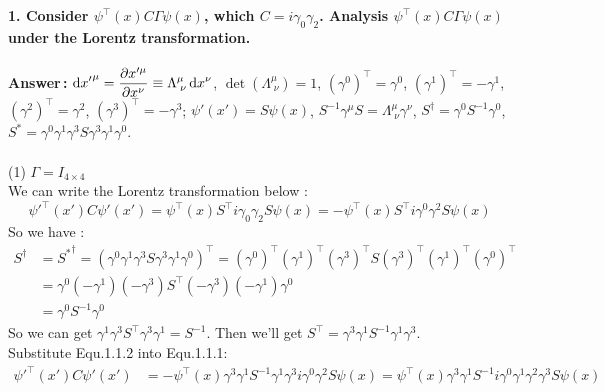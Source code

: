 \documentclass[12pt]{article}
\begin{document}
\begin{spacing}{1.5}
\textbf{1. Consider $\psi^{\top}(x)C\Gamma\psi(x)$, which $C=i\gamma_{0}\gamma_{2}$. Analysis $\psi^{\top}(x)C\Gamma\psi(x)$ under the Lorentz transformation.} \\		%
~\\
\textbf{Answer\,:} $\displaystyle\mathop{}\!\mathrm{d}{x'}^{\mu}=\frac{\partial{x'^{\mu}}}{\partial{x^{\nu}}}\equiv\Lambda^{\mu}_{\;\nu}\mathop{}\!\mathrm{d}{x}^{\nu}$, $\det(\Lambda^{\mu}_{\;\nu})=1$, $(\gamma^{0})^{\top}=\gamma^{0}$, $(\gamma^{1})^{\top}=-\gamma^{1}$, $(\gamma^{2})^{\top}=\gamma^{2}$, $(\gamma^{3})^{\top}=-\gamma^{3}$; 	
$\psi'(x')=S\psi(x)$, $S^{-1}\gamma^{\mu}S=\Lambda^{\mu}_{\;\nu}\gamma^{\nu}$, $S^{\dagger}=\gamma^{0}S^{-1}\gamma^{0}$, $S^{*}=\gamma^{0}\gamma^{1}\gamma^{3}S\gamma^{3}\gamma^{1}\gamma^{0}$.\\
~\\
(1) $\Gamma=I_{4\times4}$\\
We can write the Lorentz transformation below :
\begin{equation}
\displaystyle\psi'^{\top}(x')C\psi'(x')=\psi^{\top}(x)S^{\top}i\gamma_{0}\gamma_{2}S\psi(x)=-\psi^{\top}(x)S^{\top}i\gamma^{0}\gamma^{2}S\psi(x)
	\tag{1.1.1}
\end{equation}
So we have :\\
\begin{equation}
\begin{aligned} 	%
S^{\dagger} &= {S^{*}}^{\dagger} =(\gamma^{0}\gamma^{1}\gamma^{3}S\gamma^{3}\gamma^{1}\gamma^{0})^{\top}=(\gamma^{0})^{\top}(\gamma^{1})^{\top}(\gamma^{3})^{\top}S(\gamma^{3})^{\top}(\gamma^{1})^{\top}(\gamma^{0})^{\top} \\
&=\gamma^{0}(-\gamma^{1})(-\gamma^{3})S^{\top}(-\gamma^{3})(-\gamma^{1})\gamma^{0} \\
&=\gamma^{0}S^{-1}\gamma^{0}
\end{aligned}
	\tag{1.1.2}
\end{equation}
So we can get $\gamma^{1}\gamma^{3}S^{\top}\gamma^{3}\gamma^{1}=S^{-1}$. Then we'll get $S^{\top}=\gamma^{3}\gamma^{1}S^{-1}\gamma^{1}\gamma^{3}$.\\
Substitute Equ.1.1.2 into Equ.1.1.1:
\begin{equation}
\begin{aligned}
\displaystyle \psi'^{\top}(x')C\psi'(x') &= -\psi^{\top}(x)\gamma^{3}\gamma^{1}S^{-1}\gamma^{1}\gamma^{3}i\gamma^{0}\gamma^{2}S\psi(x)=\psi^{\top}(x)\gamma^{3}\gamma^{1}S^{-1}i\gamma^{0}\gamma^{1}\gamma^{2}\gamma^{3}S\psi(x) \\

\end{aligned}
\end{equation}
\end{spacing}
\end{document}

